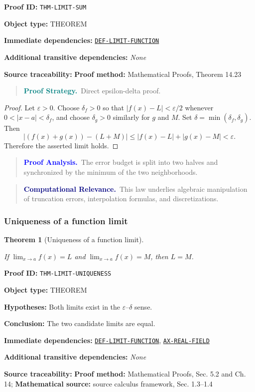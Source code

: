 \documentclass[10pt]{article}
\newcommand{\pidraw}[1]{\begingroup\urlstyle{tt}\nolinkurl{#1}\endgroup}
\newcommand{\pidref}[1]{\hyperref[prf:#1]{\pidraw{#1}}}
\newtheorem{theorem}{Theorem}[section]
\theoremstyle{definition}
\theoremstyle{remark}
\newenvironment{proofstrategy}
{\begin{quote}\small\noindent\textbf{\textcolor{teal}{Proof Strategy.}}\ }
{\end{quote}}
\newenvironment{proofanalysis}
{\begin{quote}\small\noindent\textbf{\textcolor{blue}{Proof Analysis.}}\ }
{\end{quote}}
\newenvironment{computationalrelevance}
{\begin{quote}\small\noindent\textbf{\textcolor{navy}{Computational Relevance.}}\ }
{\end{quote}}
\newcommand{\meta}[2]{\noindent\textbf{#1:} #2\par}
\begin{document}
\meta{Proof ID}{\pidraw{THM-LIMIT-SUM}}
\meta{Object type}{THEOREM}
\meta{Immediate dependencies}{\pidref{DEF-LIMIT-FUNCTION}}
\meta{Additional transitive dependencies}{\emph{None}}
\meta{Source traceability}{\textbf{Proof method:} Mathematical Proofs, Theorem 14.23}

\begin{proofstrategy}Direct epsilon-delta proof.\end{proofstrategy}

\begin{proof}

Let $\varepsilon>0$. Choose $\delta_f>0$ so that
$|f(x)-L|<\varepsilon/2$ whenever $0<|x-a|<\delta_f$, and choose
$\delta_g>0$ similarly for $g$ and $M$. Set
$\delta=\min(\delta_f,\delta_g)$. Then
\[
|(f(x)+g(x))-(L+M)|
\le |f(x)-L|+|g(x)-M|<\varepsilon.
\]
Therefore the asserted limit holds.

\end{proof}

\begin{proofanalysis}The error budget is split into two halves and synchronized by the minimum of the two neighborhoods.\end{proofanalysis}

\begin{computationalrelevance}This law underlies algebraic manipulation of truncation errors, interpolation formulas, and discretizations.\end{computationalrelevance}

\subsubsection{Uniqueness of a function limit}

\begin{theorem}[Uniqueness of a function limit]\label{prf:THM-LIMIT-UNIQUENESS}

If $\lim_{x\to a}f(x)=L$ and $\lim_{x\to a}f(x)=M$, then $L=M$.

\end{theorem}

\meta{Proof ID}{\pidraw{THM-LIMIT-UNIQUENESS}}
\meta{Object type}{THEOREM}
\meta{Hypotheses}{Both limits exist in the $\varepsilon$--$\delta$ sense.}
\meta{Conclusion}{The two candidate limits are equal.}
\meta{Immediate dependencies}{\pidref{DEF-LIMIT-FUNCTION}, \pidref{AX-REAL-FIELD}}
\meta{Additional transitive dependencies}{\emph{None}}
\meta{Source traceability}{\textbf{Proof method:} Mathematical Proofs, Sec. 5.2 and Ch. 14; \textbf{Mathematical source:} source calculus framework, Sec. 1.3--1.4}
\end{document}
